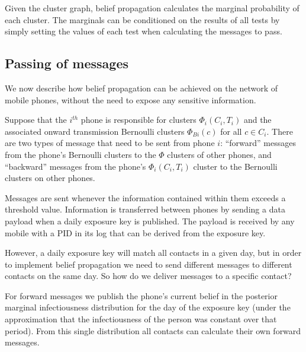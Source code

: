 \documentclass{article}
\begin{document}
Given the cluster graph, belief propagation calculates the marginal probability of each cluster. The marginals can be conditioned on the results of all tests by simply setting the values of each test when calculating the messages to pass.

\subsection{Passing of messages}

We now describe how belief propagation can be achieved on the network of mobile phones, without the need to expose any sensitive information.

Suppose that the $i^{th}$ phone is responsible for clusters $\Phi_i(C_i,T_i)$ and the associated onward transmission Bernoulli clusters $\Phi_{Bi}(c)$ for all $c\in C_i$. There are two types of message that need to be sent from phone $i$: ``forward'' messages from the phone's Bernoulli clusters to the $\Phi$ clusters of other phones, and ``backward'' messages from the phone's $\Phi_i(C_i,T_i)$ cluster to the Bernoulli clusters on other phones.

Messages are sent whenever the information contained within them exceeds a threshold value. Information is transferred between phones by sending a data payload when a daily exposure key is published. The payload is received by any mobile with a PID in its log that can be derived from the exposure key.

However, a daily exposure key will match all contacts in a given day, but in order to implement belief propagation we need to send different messages to different contacts on the same day. So how do we deliver messages to a specific contact?

For forward messages we publish the phone's current belief in the posterior marginal infectiousness distribution for the day of the exposure key (under the approximation that the infectiousness of the person was constant over that period). From this single distribution all contacts can calculate their own forward messages.
\end{document}
